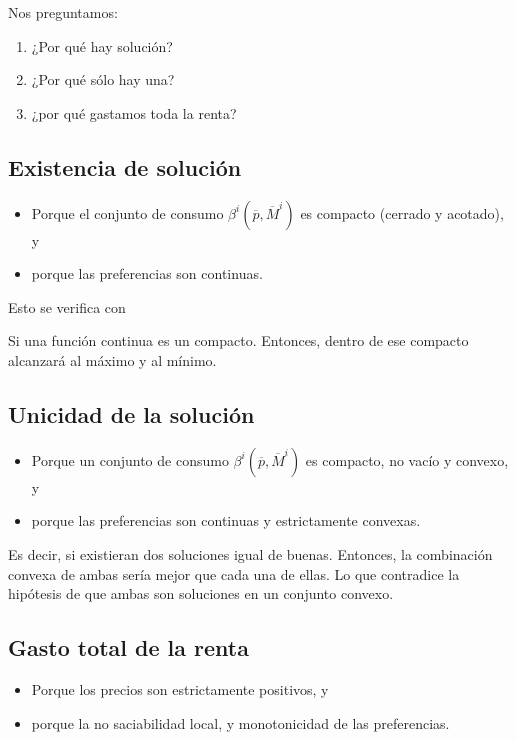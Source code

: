 Nos preguntamos:

\begin{enumerate}
    \item ¿Por qué hay solución?
    \item ¿Por qué sólo hay una?
    \item ¿por qué gastamos toda la renta?
\end{enumerate}

\subsection{Existencia de solución}

\begin{itemize}
    \item Porque el conjunto de consumo $\beta^i\left(\overline{p},\overline{M}^i\right)$ es compacto (cerrado y acotado), y
    \item porque las preferencias son continuas.
\end{itemize}

Esto se verifica con

\begin{teo} Si una función continua es un compacto. Entonces, dentro de ese compacto alcanzará al máximo y al mínimo.
\end{teo}

\subsection{Unicidad de la solución}
\begin{itemize}
    \item Porque un conjunto de consumo $\beta^i\left(\overline{p},\overline{M}^i\right)$ es compacto, no vacío y convexo, y
    \item porque las preferencias son continuas y estrictamente convexas.
\end{itemize}

Es decir, si existieran dos soluciones igual de buenas. Entonces, la combinación convexa de ambas sería mejor que cada una de ellas. Lo que contradice la hipótesis de que ambas son soluciones en un conjunto convexo.

\subsection{Gasto total de la renta}
\begin{itemize}
    \item Porque los precios son estrictamente positivos, y
    \item porque la no saciabilidad local, y monotonicidad de las preferencias. 
\end{itemize}


